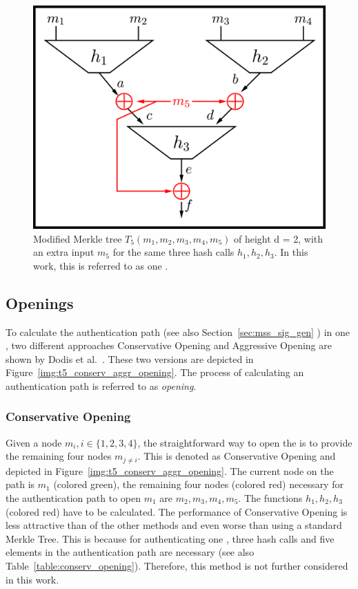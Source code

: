 \begin{figure}
\centering
\includegraphics[]{images/Methods/abcd_paperT5_block_depiction.png}
\caption{Modified Merkle tree $T_5(m_1, m_2, m_3, m_4, m_5)$ of height d = 2,   with an extra input $m_5$ for the same three hash calls $h_1, h_2, h_3$. In this work, this is referred to as one \tfblock.~\cite{T5_paper}}
\label{img:t5_paper_block_depiction}
\end{figure}

\subsection{\texorpdfstring{\tf}{T5} Openings}
To calculate the authentication path (see also Section~\ref{sec:mss_sig_gen} ) in one \tfblock, two different approaches Conservative Opening and Aggressive Opening are shown by Dodis et al.~\cite{T5_paper}. These two versions are depicted in Figure~\ref{img:t5_conserv_aggr_opening}.
The process of calculating an authentication path is referred to as \textit{opening}. 

\subsubsection{Conservative Opening}
\label{sec:conserv_opening}
Given a node $m_i, i \in \{1,2,3,4\}$, the straightforward way to open the \tfblock is to provide the remaining four nodes $m_{j \neq i}$. This is denoted as Conservative Opening and depicted in Figure~\ref{img:t5_conserv_aggr_opening}. The current node on the path is $m_1$ (colored green), the remaining four nodes (colored red) necessary for the authentication path to open $m_1$ are $m_2, m_3, m_4, m_5$. The functions $h_1, h_2, h_3$ (colored red) have to be calculated. The performance of Conservative Opening is less attractive than of the other methods and even worse than using a standard Merkle Tree. This is because for authenticating one \tfblock, three hash calls and five elements in the authentication path are necessary (see also Table~\ref{table:conserv_opening}). Therefore, this method is not further considered in this work. 

